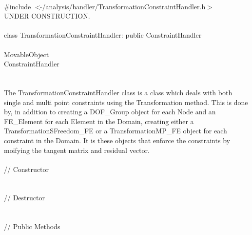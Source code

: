 
   \\
\indent \#include $<\tilde{
}$/analysis/handler/TransformationConstraintHandler.h$>$  \\ 

UNDER CONSTRUCTION.\\

  \\
\indent class TransformationConstraintHandler: public ConstraintHandler  \\

 \\
\indent MovableObject \\
\indent\indent ConstraintHandler \\
\indent\indent{} \\

 \\ 
\indent The TransformationConstraintHandler class is a class which deals with
both single and multi point constraints using the Transformation method. 
This is done by, in addition to creating a DOF\_Group object
for each Node and an FE\_Element for each Element in the Domain,
creating either a TransformationSFreedom\_FE or a TransformationMP\_FE object for each
constraint in the Domain. It is these objects that enforce the
constraints by moifying the tangent matrix and residual vector. \\ 


 \\
\indent // Constructor \\
\\  \\ 
\indent // Destructor \\
\\  \\
\indent // Public Methods\\
 \\ 
 \\ 
\\
\\
 \\
 \\


